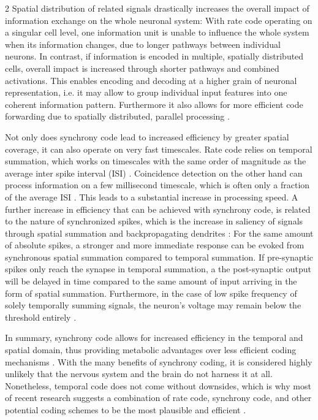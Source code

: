 \documentclass[12pt,a4paper]{article}
\begin{document}
\begin{multicols}{2}
            Spatial distribution of related signals drastically increases the overall impact of information exchange on the whole neuronal system: With rate code operating on a singular cell level, one information unit is unable to influence the whole system when its information changes, due to longer pathways between individual neurons. In contrast, if information is encoded in multiple, spatially distributed cells, overall impact is increased through shorter pathways and combined activations. This enables encoding and decoding at a higher grain of neuronal representation, i.e. it may allow to group individual input features into one coherent information pattern. Furthermore it also allows for more efficient code forwarding due to spatially distributed, parallel processing \cite{R, L}.
            
            Not only does synchrony code lead to increased efficiency by greater spatial coverage, it can also operate on very fast timescales. Rate code relies on temporal summation, which works on timescales with the same order of magnitude as the average inter spike interval (ISI) \cite{R, Z}. Coincidence detection on the other hand can process information on a few millisecond timescale, which is often only a fraction of the average ISI \cite{R}. This leads to a substantial increase in processing speed. A further increase in efficiency that can be achieved with synchrony code, is related to the nature of synchronized spikes, which is the increase in saliency of signals through spatial summation and backpropagating dendrites \cite{G}: For the same amount of absolute spikes, a stronger and more immediate response can be evoked from synchronous spatial summation compared to temporal summation. If pre-synaptic spikes only reach the synapse in temporal summation, a the post-synaptic output will be delayed in time compared to the same amount of input arriving in the form of spatial summation. Furthermore, in the case of low spike frequency of solely temporally summing signals, the neuron's voltage may remain below the threshold entirely \cite{G, Z}. 
            
            In summary, synchrony code allows for increased efficiency in the temporal and spatial domain, thus providing metabolic advantages over less efficient coding mechanisms \cite{L}. With the many benefits of synchrony coding, it is considered highly unlikely that the nervous system and the brain do not harness it at all. Nonetheless, temporal code does not come without downsides, which is why most of recent research suggests a combination of rate code, synchrony code, and other potential coding schemes to be the most plausible and efficient \cite{L, G, R}.
        

\end{multicols}
\end{document}
